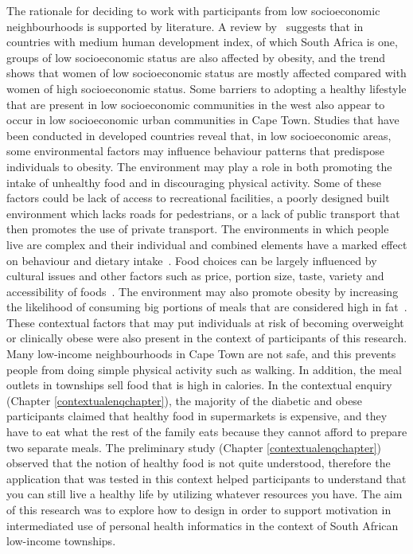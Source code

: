 The rationale for  deciding to work with participants from low socioeconomic neighbourhoods is supported by literature. A review by~\cite{dinsa2012obesity} suggests that in countries with medium human development index, of which South Africa is one, groups of low socioeconomic status are also affected by obesity, and the trend shows that women of low socioeconomic status are mostly affected compared with women of high socioeconomic status. Some barriers to adopting a healthy lifestyle that are present in low socioeconomic communities in the west also appear to occur in low socioeconomic urban communities in Cape Town. Studies that have been conducted in developed countries reveal that, in low socioeconomic areas, some environmental factors may influence behaviour patterns that predispose individuals to obesity. The environment may play a role in both promoting the intake of unhealthy food and in discouraging physical activity. Some of these factors could be lack of access to recreational facilities, a poorly designed built environment which lacks roads for pedestrians, or a lack of public transport that then promotes the use of private transport. The environments in which people live are complex and their individual and combined elements have a marked effect on behaviour and dietary intake~\citep{swinburn2004diet}. Food choices can be largely influenced by cultural issues and other factors such as price, portion size, taste, variety and accessibility of foods~\citep{ali2009factors}. The environment may also promote obesity by increasing the likelihood of consuming big portions of meals that are considered high in fat~\citep{hill1998environmental}. These contextual factors that may put individuals at risk of becoming overweight or clinically obese were also present in the context of participants of this research. Many low-income neighbourhoods in Cape Town are not safe, and this prevents people from doing simple physical activity such as walking. In addition, the meal outlets in townships sell food that is high in calories. In the contextual enquiry (Chapter \ref{contextualenqchapter}), the majority of the diabetic and obese participants claimed that healthy food in supermarkets is expensive, and they have to eat what the rest of the family eats because they cannot afford to prepare two separate meals. The preliminary study (Chapter \ref{contextualenqchapter}) observed that the notion of healthy food is not quite understood, therefore the application that was tested in this context helped participants to understand that you can still live a healthy life by utilizing whatever resources you have. The aim of this research was to explore how to design in order to support motivation in intermediated use of personal health informatics in the context of South African low-income townships. 

